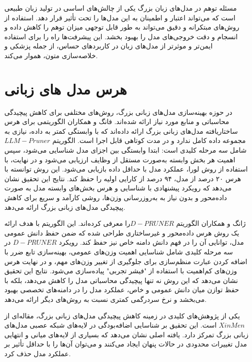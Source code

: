 مسئله توهم در مدل‌های زبان بزرگ یکی از چالش‌های اساسی در تولید زبان طبیعی است که می‌تواند اعتبار و اطمینان به این مدل‌ها را تحت تأثیر قرار دهد. استفاده از روش‌های مبتکرانه و دقیق می‌تواند به طور قابل توجهی میزان توهم را کاهش داده و انسجام و دقت خروجی‌های مدل را بهبود بخشد. این پیشرفت‌ها راه را برای استفاده ایمن‌تر و موثرتر از مدل‌های زبان در کاربردهای حساس، از جمله پزشکی و خلاصه‌سازی متون، هموار می‌کند.

\section{هرس مدل های زبانی}

در حوزه بهینه‌سازی مدل‌های زبانی بزرگ، روش‌های مختلفی برای کاهش پیچیدگی محاسباتی و منابع مورد نیاز ارائه شده‌اند.
فانگ و همکاران الگوریتمی برای هرس ساختاریافته مدل‌های زبانی بزرگ ارائه داده‌اند که با وابستگی کمتر به داده، نیازی به مجموعه داده کامل ندارد و در مدت کوتاهی قابل اجرا است. الگوریتم $LLM-Pruner$ شامل سه مرحله کلیدی است: ابتدا وابستگی بین اجزای مدل شناسایی می‌شود، سپس اهمیت هر بخش وابسته به‌صورت مستقل از وظایف  ارزیابی می‌شود و در نهایت، با استفاده از روش لورا، عملکرد مدل با حداقل داده بازیابی می‌شود. این روش توانسته با هرس ۲۰ درصد از مدل، ۹۴ درصد از کارایی اولیه را حفظ کند. نتایج این تحقیق نشان می‌دهد که رویکرد پیشنهادی با شناسایی و هرس بخش‌های وابسته مدل به صورت داده‌محور و بدون نیاز به به‌روزرسانی وزن‌ها، روشی کارآمد و سریع برای کاهش پیچیدگی مدل‌های زبانی بزرگ ارائه می‌دهد\cite{men2024shortgpt,}.


 ژانگ و همکاران  الگوریتم $D-PRUNER $را معرفی کرده‌اند. این الگوریتم با هدف ارائه یک روش هرس داده‌محور و غیرساختاری طراحی شده که ضمن حفظ دانش عمومی مدل، توانایی آن را در فهم دانش دامنه خاص نیز حفظ کند. رویکرد $D-PRUNER$ در سه مرحله کلیدی شامل شناسایی اهمیت وزن‌های عمومی، بهینه‌سازی تابع ضرر با اضافه کردن  عبارت منظم‌سازی      برای جلوگیری از تغییر وزن‌های مهم، و در نهایت هرس وزن‌های کم‌اهمیت با استفاده از "فیشر تجربی" پیاده‌سازی می‌شود. نتایج این تحقیق نشان می‌دهد که این روش نه تنها پیچیدگی محاسباتی مدل را کاهش می‌دهد، بلکه با حفظ توازن میان دانش عمومی و خاص، عملکرد مدل را در دامنه‌های تخصصی بهبود می‌بخشد و نرخ سردرگمی  کمتری نسبت به روش‌های دیگر ارائه می‌دهد\cite{zhang2024pruning}.

یکی از پژوهش‌های کلیدی در زمینه کاهش پیچیدگی مدل‌های زبانی بزرگ، مقاله‌ای از $Xin Men$ است. این تحقیق بر شناسایی  اضافه‌بودگی   در لایه‌های شبکه عصبی مدل‌های زبانی بزرگ تمرکز دارد. یافته اصلی نشان می‌دهد که بسیاری از لایه‌های میانی و انتهایی مدل تغییرات محدودی در حالات پنهان ایجاد می‌کنند و می‌توان آن‌ها را با حداقل تأثیر بر عملکرد مدل حذف کرد.

